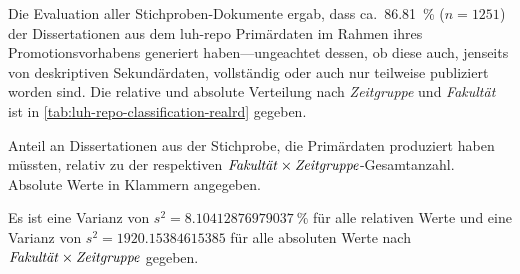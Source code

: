 Die Evaluation aller Stichproben-Dokumente ergab, dass ca.~\SI{86,81}{\percent} ($n=\num{1251}$) der Dissertationen aus dem \gls{luh-repo} Primärdaten im Rahmen ihres Promotionsvorhabens generiert haben---ungeachtet dessen, ob diese auch, jenseits von deskriptiven Sekundärdaten, vollständig oder auch nur teilweise publiziert worden sind.
Die relative und absolute Verteilung nach \textit{Zeitgruppe} und \textit{Fakultät} ist in \cref{tab:luh-repo-classification-realrd} gegeben.
\begin{table}[!htbp]
	\caption{Anteil an Dissertationen aus der Stichprobe, die Primärdaten produziert haben müssten, relativ zu der respektiven $\text{\textit{Fakultät}}\times\text{\textit{Zeitgruppe}}$-Gesamtanzahl.
    Absolute Werte in Klammern angegeben.}
    
    \label{tab:luh-repo-classification-realrd}
\end{table}
Es ist eine Varianz von $s^2=\SI[round-mode=places,round-precision=3]{8.10412876979037}{\percent}$ für alle relativen Werte und eine Varianz von $s^2=\num[round-mode=places,round-precision=3]{1920.15384615385}$ für alle absoluten Werte nach $\text{\textit{Fakultät}}\times\text{\textit{Zeitgruppe}}$ gegeben.

